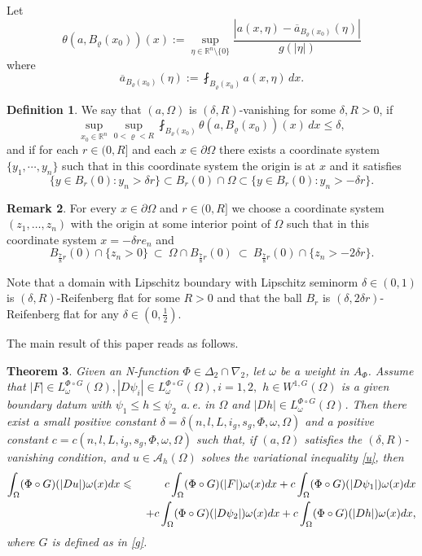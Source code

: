 \documentclass[10pt,a4paper]{article}
\newtheorem{theorem}{Theorem}[section]
\theoremstyle{definition}
\newtheorem{remark}[theorem]{Remark}
\newtheorem{definition}[theorem]{Definition}
\numberwithin{equation}{section}
\newcommand{\ls}{\leqslant}
\begin{document}
Let 
\[
\theta(a, B_\varrho(x_0))(x) := \sup_{\eta \in \mathbb{R}^n \setminus \{0\}} \frac{|a(x, \eta) - \overline{a}_{B_\varrho(x_0)}(\eta)|}{g(|\eta|)}
\]
where 
\[
\overline{a}_{B_\varrho(x_0)}(\eta) := \fint_{B_\varrho(x_0)} a(x, \eta) \,  {d}x.
\]
 \begin{definition}
   We say that $(a, \Omega)$ is $(\delta, R)$-vanishing for some $\delta,R > 0$, if
\[
\sup_{x_0 \in \mathbb{R}^n} \sup_{0 < \varrho < R} \fint_{B_\varrho(x_0)} \theta(a, B_\varrho(x_0))(x) \,  {d}x \leq \delta,
\]
and if for each $r \in (0, R]$ and each $x \in \partial\Omega$ there exists a coordinate system $\{y_1, \cdots, y_n\}$ such that in this coordinate system the origin is at $x$ and it satisfies
\[
\{y \in B_r(0) : y_n > \delta r\} \subset B_r(0) \cap \Omega \subset \{y \in B_r(0) : y_n > -\delta r\}. 
\]
 \end{definition}
\begin{remark}\label{rei}
	For every $x \in \partial \Omega$ and $r \in (0,R]$ we choose a coordinate system $(z_1,\dots,z_n)$ with the origin at some interior point of $  \Omega$ such that in this coordinate system $x=- \delta re_n$ and
	$$
	B_{\frac{7}{8}r}(0)\cap \{z_n>0\} \ \subset\ \Omega\cap B_{\frac{7}{8}r}(0)\ \subset\ B_{\frac{7}{8}r}(0)\cap \{z_n>-2\delta r\}.
	$$
	
	
	Note that a domain with Lipschitz boundary with Lipschitz seminorm $\delta\in(0,1)$
	is $(\delta,R)$-Reifenberg flat for some $R>0$ and that the ball $B_r$ is $(\delta,2\delta r)$-Reifenberg flat for any $\delta\in (0,\frac{1}{2})$.
\end{remark}


The main result of this paper reads as follows.
 \begin{theorem}\label{weight}
 	Given  an N-function $\Phi \in \Delta_2 \cap\nabla_2$, let $\omega$ be a weight in $A_{\Phi}$. Assume that $|F|\in L^{\Phi\circ G}_{\omega}(\Omega), |D\psi_i|\in L^{\Phi\circ G}_{\omega}(\Omega), i=1,2,$ $h\in W^{1,G}(\Omega)$ is a given boundary datum with $\psi_1 \leq h \leq \psi_2$ a.\,e. in $\Omega$ and $ |Dh|\in L^{\Phi\circ G}_{\omega}(\Omega)$. Then there exist a small positive constant
 	$
 	\delta=\delta(n,l,L,i_g,s_g, \Phi,\omega, \Omega)
 	$
 	and a positive constant
 	$
 	c=c(n,l,L,i_g,s_g, \Phi,\omega, \Omega)
 	$
 	such that, if $(a,\Omega)$ satisfies the $(\delta,R)$-vanishing
 	condition,
 and $u \in \mathcal{A}_{h}(\Omega)$ solves the variational inequality \eqref{u}, then
 	\begin{eqnarray}\label{uff}\nonumber
 		\int_{\Omega}(\Phi\circ G)(|Du|)\omega(x)dx& \ls& c\int_{\Omega}(\Phi\circ G)(|F|)\omega(x)dx+c\int_{\Omega}(\Phi\circ G)(|D\psi_1|)\omega(x)dx\\
 		&&\hspace{0.1cm}+c\int_{\Omega}(\Phi\circ G)(|D\psi_2|)\omega(x)dx+c\int_{\Omega}(\Phi\circ G)(|Dh|)\omega(x)dx,
 	\end{eqnarray}
 	where $G$ is defined as in \eqref{g}.
 \end{theorem}
 
\end{document}
